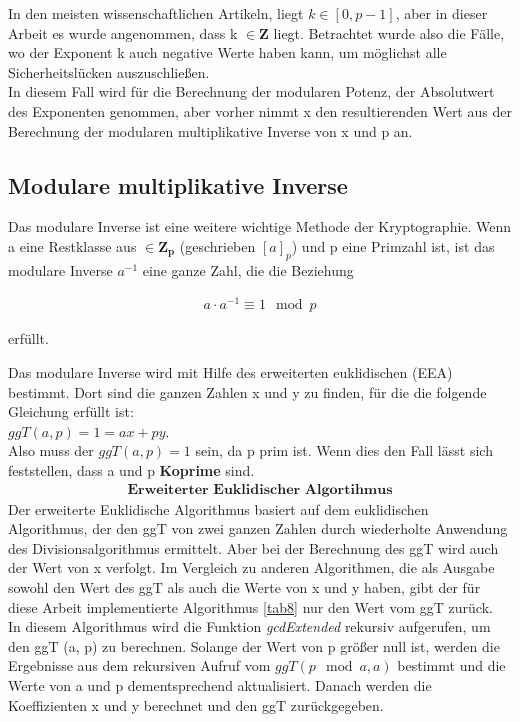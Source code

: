 In den meisten wissenschaftlichen Artikeln, liegt $ k \in [0, p-1] $, aber in dieser Arbeit es wurde angenommen, dass k $ \in \mathbf{Z}$ liegt. 
Betrachtet wurde also die Fälle, wo der Exponent k auch negative
Werte haben kann, um möglichst alle Sicherheitslücken  auszuschließen. \\

In diesem Fall wird für die Berechnung der modularen
Potenz, der Absolutwert des Exponenten genommen, aber
vorher nimmt x den
resultierenden Wert aus der Berechnung der modularen multiplikative Inverse von x und p an.


\subsection{Modulare multiplikative Inverse}

Das modulare Inverse ist eine weitere wichtige Methode der Kryptographie. Wenn a eine Restklasse aus $\in \mathbf{Z_p} $  (geschrieben $[a]_p$) und p eine Primzahl ist, ist das
modulare Inverse $ a^{-1} $ eine ganze Zahl, die die Beziehung 
\begin{ceqn}
 \begin{align*}
     a \cdot a^{-1} \equiv 1 \mod p 
 \end{align*}
\end{ceqn} erfüllt.

Das modulare Inverse wird mit Hilfe des erweiterten euklidischen (EEA) bestimmt.
Dort sind die ganzen Zahlen x und y zu finden, für die die folgende Gleichung erfüllt ist: \\
$ ggT (a, p) = 1 = ax + py $. \\
Also muss der $ ggT (a, p) = 1 $ sein, da p prim ist. Wenn dies den Fall lässt sich feststellen, dass a und p \textbf{Koprime} sind.
\begin{align*}
    \textbf{Erweiterter Euklidischer Algortihmus}
\end{align*}
Der erweiterte Euklidische Algorithmus basiert auf dem euklidischen Algorithmus, der den ggT von zwei ganzen Zahlen durch wiederholte Anwendung des Divisionsalgorithmus ermittelt. Aber bei der Berechnung des ggT wird auch der Wert von x verfolgt. Im Vergleich zu anderen Algorithmen, die als Ausgabe sowohl den Wert des ggT als auch die Werte von x und y haben, gibt der für diese Arbeit implementierte Algorithmus \ref{tab8} nur den Wert vom ggT zurück. \\

In diesem Algorithmus wird die Funktion \textit{gcdExtended} rekursiv aufgerufen, um den ggT (a, p) zu berechnen. Solange der Wert von p größer null ist, werden die Ergebnisse aus dem rekursiven Aufruf vom \( ggT (p \mod a, a) \) bestimmt und die Werte von a und p dementsprechend aktualisiert. Danach werden die Koeffizienten x und y berechnet und den ggT zurückgegeben.

